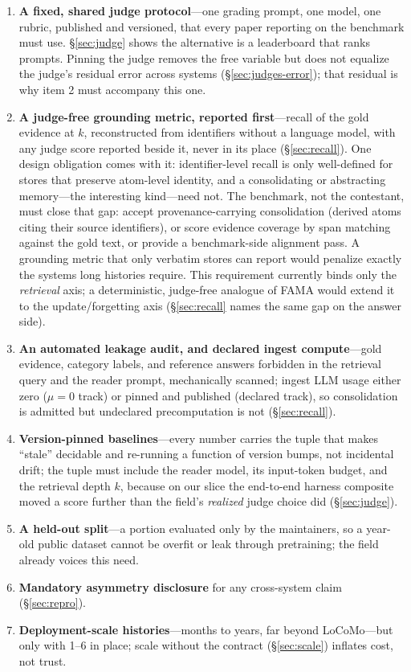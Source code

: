 \documentclass[11pt]{article}
\begin{document}
\begin{enumerate}
  \item \textbf{A fixed, shared judge protocol}---one grading prompt, one model, one rubric, published and versioned, that every paper reporting on the benchmark must use. \S\ref{sec:judge} shows the alternative is a leaderboard that ranks prompts. Pinning the judge removes the free variable but does not equalize the judge's residual error across systems (\S\ref{sec:judges-error}); that residual is why item 2 must accompany this one.
  \item \textbf{A judge-free grounding metric, reported first}---recall of the gold evidence at $k$, reconstructed from identifiers without a language model, with any judge score reported beside it, never in its place (\S\ref{sec:recall}). One design obligation comes with it: identifier-level recall is only well-defined for stores that preserve atom-level identity, and a consolidating or abstracting memory---the interesting kind---need not. The benchmark, not the contestant, must close that gap: accept provenance-carrying consolidation (derived atoms citing their source identifiers), or score evidence coverage by span matching against the gold text, or provide a benchmark-side alignment pass. A grounding metric that only verbatim stores can report would penalize exactly the systems long histories require. This requirement currently binds only the \emph{retrieval} axis; a deterministic, judge-free analogue of FAMA \citep{uddin2026memora} would extend it to the update/forgetting axis (\S\ref{sec:recall} names the same gap on the answer side).
  \item \textbf{An automated leakage audit, and declared ingest compute}---gold evidence, category labels, and reference answers forbidden in the retrieval query and the reader prompt, mechanically scanned; ingest LLM usage either zero ($\mu=0$ track) or pinned and published (declared track), so consolidation is admitted but undeclared precomputation is not (\S\ref{sec:recall}).
  \item \textbf{Version-pinned baselines}---every number carries the tuple that makes ``stale'' decidable and re-running a function of version bumps, not incidental drift; the tuple must include the reader model, its input-token budget, and the retrieval depth $k$, because on our slice the end-to-end harness composite moved a score further than the field's \emph{realized} judge choice did (\S\ref{sec:judge}).
  \item \textbf{A held-out split}---a portion evaluated only by the maintainers, so a year-old public dataset cannot be overfit or leak through pretraining; the field already voices this need.\citep[\S5.4]{synthius}
  \item \textbf{Mandatory asymmetry disclosure} for any cross-system claim (\S\ref{sec:repro}).
  \item \textbf{Deployment-scale histories}---months to years, far beyond LoCoMo---but only with 1--6 in place; scale without the contract (\S\ref{sec:scale}) inflates cost, not trust.
\end{enumerate}
\end{document}
